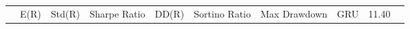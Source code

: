 \begin{tabular}{lrrrrrrrrr}
 & E(R) & Std(R) & Sharpe Ratio & DD(R) & Sortino Ratio & Max Drawdown & %
GRU & 11.40%
\end{tabular}
